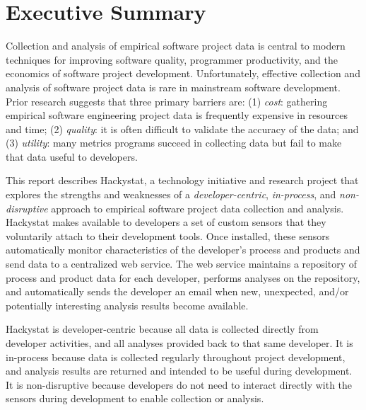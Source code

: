 
\section{Executive Summary}


Collection and analysis of empirical software project data is central to
modern techniques for improving software quality, programmer productivity,
and the economics of software project development.  Unfortunately,
effective collection and analysis of software project data is rare in
mainstream software development. Prior research suggests that three primary
barriers are: (1) {\em cost}: gathering empirical software engineering
project data is frequently expensive in resources and time; (2) {\em
  quality}: it is often difficult to validate the accuracy of the data; and
(3) {\em utility}: many metrics programs succeed in collecting data but
fail to make that data useful to developers.

This report describes Hackystat, a technology initiative and research
project that explores the strengths and weaknesses of a {\em
  developer-centric}, {\em in-process}, and {\em non-disruptive} approach
to empirical software project data collection and analysis. 
Hackystat makes available to developers a set of custom sensors that they
voluntarily attach to their development tools.  Once installed, these
sensors automatically monitor characteristics of the developer's process
and products and send data to a centralized web service.  The web service
maintains a repository of process and product data for each developer,
performs analyses on the repository, and automatically sends the developer
an email when new, unexpected, and/or potentially interesting analysis
results become available.

Hackystat is developer-centric because all data is collected directly from
developer activities, and all analyses provided back to that same
developer. It is in-process because data is collected regularly throughout
project development, and analysis results are returned and intended to be
useful during development. It is non-disruptive because developers do not
need to interact directly with the sensors during development to enable
collection or analysis.

